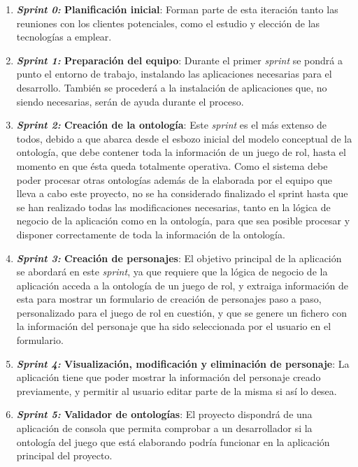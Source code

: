 \begin{enumerate}
    
    \item \textbf{\textit{Sprint 0:} Planificación inicial}: Forman parte de esta 
    iteración tanto las reuniones con los clientes potenciales, como el estudio y 
    elección de las tecnologías a emplear.

    \item \textbf{\textit{Sprint 1:} Preparación del equipo}: Durante el primer \textit{sprint}
    se pondrá a punto el entorno de trabajo, instalando las aplicaciones necesarias para el 
    desarrollo. También se procederá a la instalación de aplicaciones que, no siendo necesarias, 
    serán de ayuda durante el proceso.

    \item \textbf{\textit{Sprint 2:} Creación de la ontología}: Este \textit{sprint} 
    es el más extenso de todos, debido a que abarca desde el esbozo inicial del modelo 
    conceptual de la ontología, que debe contener toda la información de un juego de rol, 
    hasta el momento en que ésta queda totalmente operativa.
    Como el sistema debe poder procesar otras ontologías además de la elaborada por el 
    equipo que lleva a cabo este proyecto, no se ha considerado finalizado el sprint 
    hasta que se han realizado todas las modificaciones necesarias, tanto en la lógica 
    de negocio de la aplicación como en la ontología, para que sea posible procesar y 
    disponer correctamente de toda la información de la ontología.

    \item \textbf{\textit{Sprint 3:} Creación de personajes}: El objetivo principal de 
    la aplicación se abordará en este \textit{sprint}, ya que requiere que la lógica de 
    negocio de la aplicación acceda a la ontología de un juego de rol, y extraiga información 
    de esta para mostrar un formulario de creación de personajes paso a paso, personalizado 
    para el juego de rol en cuestión, y que se genere un fichero con la información del personaje 
    que ha sido seleccionada por el usuario en el formulario.   

    \item \textbf{\textit{Sprint 4:} Visualización, modificación y eliminación de personaje}: La aplicación tiene que poder 
    mostrar la información del personaje creado previamente, y permitir al usuario editar parte de la misma si 
    así lo desea.

    \item \textbf{\textit{Sprint 5:} Validador de ontologías}: El proyecto dispondrá de una aplicación de consola 
    que permita comprobar a un desarrollador si la ontología del juego que está elaborando podría funcionar en la 
    aplicación principal del proyecto.


\end{enumerate}
